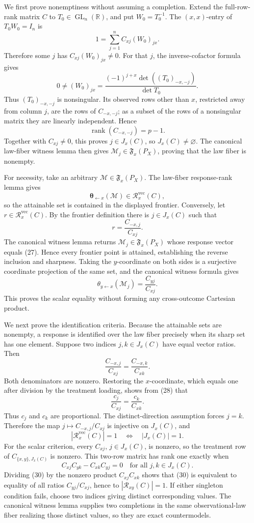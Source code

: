 We first prove nonemptiness without assuming a completion. Extend the full-row-rank matrix \(C\) to \(T_0\in\operatorname{GL}_n(\mathbb R)\), and put \(W_0=T_0^{-1}\). The \((x,x)\)-entry of \(T_0W_0=I_n\) is
\[
1=\sum_{j=1}^n C_{xj}(W_0)_{jx}. \tag{24}
\]
Therefore some \(j\) has \(C_{xj}(W_0)_{jx}\ne0\). For that \(j\), the inverse-cofactor formula gives
\[
0\ne (W_0)_{jx}
=\frac{(-1)^{j+x}\det((T_0)_{-x,-j})}{\det T_0}. \tag{25}
\]
Thus \((T_0)_{-x,-j}\) is nonsingular. Its observed rows other than \(x\), restricted away from column \(j\), are the rows of \(C_{-x,-j}\); as a subset of the rows of a nonsingular matrix they are linearly independent. Hence
\[
\operatorname{rank}(C_{-x,-j})=p-1.
\]
Together with \(C_{xj}\ne0\), this proves \(j\in J_x(C)\), so \(J_x(C)\ne\varnothing\). The canonical law-fiber witness lemma then gives \(\mathcal M_j\in\mathfrak F_x(P_X)\), proving that the law fiber is nonempty.

For necessity, take an arbitrary \(\mathcal M\in\mathfrak F_x(P_X)\). The law-fiber response-rank lemma gives
\[
\boldsymbol\theta_{\leftarrow x}(\mathcal M)\in\mathcal R_x^{\mathrm{vec}}(C), \tag{26}
\]
so the attainable set is contained in the displayed frontier. Conversely, let \(r\in\mathcal R_x^{\mathrm{vec}}(C)\). By the frontier definition there is \(j\in J_x(C)\) such that
\[
r=\frac{C_{-x,j}}{C_{xj}}. \tag{27}
\]
The canonical witness lemma returns \(\mathcal M_j\in\mathfrak F_x(P_X)\) whose response vector equals (27). Hence every frontier point is attained, establishing the reverse inclusion and sharpness. Taking the \(y\)-coordinate on both sides is a surjective coordinate projection of the same set, and the canonical witness formula gives
\[
\theta_{y\leftarrow x}(\mathcal M_j)=\frac{C_{yj}}{C_{xj}}.
\]
This proves the scalar equality without forming any cross-outcome Cartesian product.

We next prove the identification criteria. Because the attainable sets are nonempty, a response is identified over the law fiber precisely when its sharp set has one element. Suppose two indices \(j,k\in J_x(C)\) have equal vector ratios. Then
\[
\frac{C_{-x,j}}{C_{xj}}=\frac{C_{-x,k}}{C_{xk}}. \tag{28}
\]
Both denominators are nonzero. Restoring the \(x\)-coordinate, which equals one after division by the treatment loading, shows from (28) that
\[
\frac{c_j}{C_{xj}}=\frac{c_k}{C_{xk}}.
\]
Thus \(c_j\) and \(c_k\) are proportional. The distinct-direction assumption forces \(j=k\). Therefore the map \(j\mapsto C_{-x,j}/C_{xj}\) is injective on \(J_x(C)\), and
\[
|\mathcal R_x^{\mathrm{vec}}(C)|=1
\quad\Longleftrightarrow\quad |J_x(C)|=1. \tag{29}
\]
For the scalar criterion, every \(C_{xj}\), \(j\in J_x(C)\), is nonzero, so the treatment row of \(C_{\{x,y\},J_x(C)}\) is nonzero. This two-row matrix has rank one exactly when
\[
C_{xj}C_{yk}-C_{xk}C_{yj}=0
\quad\text{for all }j,k\in J_x(C). \tag{30}
\]
Dividing (30) by the nonzero product \(C_{xj}C_{xk}\) shows that (30) is equivalent to equality of all ratios \(C_{yj}/C_{xj}\), hence to \(|\mathcal R_{xy}(C)|=1\). If either singleton condition fails, choose two indices giving distinct corresponding values. The canonical witness lemma supplies two completions in the same observational-law fiber realizing those distinct values, so they are exact countermodels.

